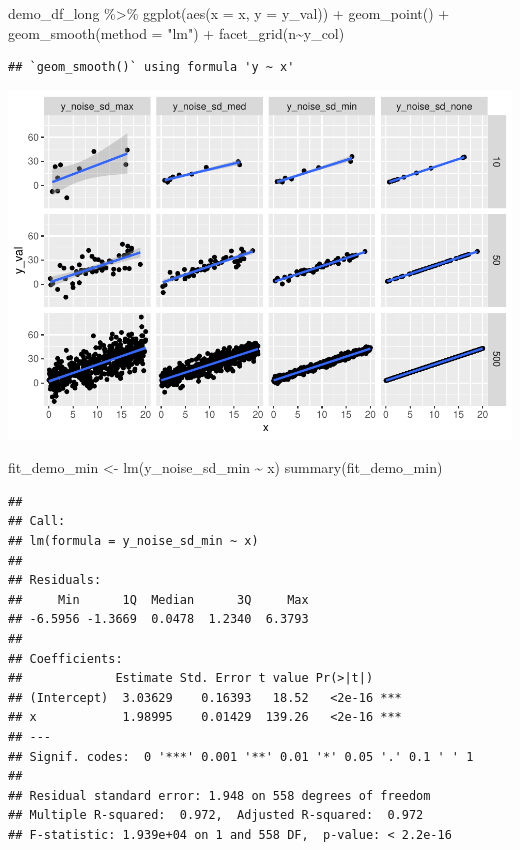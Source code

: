 \documentclass[
]{book}
\newenvironment{Shaded}{\begin{snugshade}}{\end{snugshade}}
\newcommand{\AttributeTok}[1]{\textcolor[rgb]{0.77,0.63,0.00}{#1}}
\newcommand{\FunctionTok}[1]{\textcolor[rgb]{0.00,0.00,0.00}{#1}}
\newcommand{\NormalTok}[1]{#1}
\newcommand{\OtherTok}[1]{\textcolor[rgb]{0.56,0.35,0.01}{#1}}
\newcommand{\SpecialCharTok}[1]{\textcolor[rgb]{0.00,0.00,0.00}{#1}}
\newcommand{\StringTok}[1]{\textcolor[rgb]{0.31,0.60,0.02}{#1}}
\begin{document}
\begin{Shaded}
\begin{Highlighting}[]
\NormalTok{demo\_df\_long }\SpecialCharTok{\%\textgreater{}\%} 
  \FunctionTok{ggplot}\NormalTok{(}\FunctionTok{aes}\NormalTok{(}\AttributeTok{x =}\NormalTok{ x, }\AttributeTok{y =}\NormalTok{ y\_val)) }\SpecialCharTok{+}
  \FunctionTok{geom\_point}\NormalTok{() }\SpecialCharTok{+}
  \FunctionTok{geom\_smooth}\NormalTok{(}\AttributeTok{method =} \StringTok{"lm"}\NormalTok{) }\SpecialCharTok{+} 
  \FunctionTok{facet\_grid}\NormalTok{(n}\SpecialCharTok{\textasciitilde{}}\NormalTok{y\_col)}
\end{Highlighting}
\end{Shaded}

\begin{verbatim}
## `geom_smooth()` using formula 'y ~ x'
\end{verbatim}

\includegraphics{test_course_notes_files/figure-latex/unnamed-chunk-85-1.pdf}

\begin{Shaded}
\begin{Highlighting}[]
\NormalTok{fit\_demo\_min }\OtherTok{\textless{}{-}} \FunctionTok{lm}\NormalTok{(y\_noise\_sd\_min }\SpecialCharTok{\textasciitilde{}}\NormalTok{ x)}
\FunctionTok{summary}\NormalTok{(fit\_demo\_min)}
\end{Highlighting}
\end{Shaded}

\begin{verbatim}
## 
## Call:
## lm(formula = y_noise_sd_min ~ x)
## 
## Residuals:
##     Min      1Q  Median      3Q     Max 
## -6.5956 -1.3669  0.0478  1.2340  6.3793 
## 
## Coefficients:
##             Estimate Std. Error t value Pr(>|t|)    
## (Intercept)  3.03629    0.16393   18.52   <2e-16 ***
## x            1.98995    0.01429  139.26   <2e-16 ***
## ---
## Signif. codes:  0 '***' 0.001 '**' 0.01 '*' 0.05 '.' 0.1 ' ' 1
## 
## Residual standard error: 1.948 on 558 degrees of freedom
## Multiple R-squared:  0.972,  Adjusted R-squared:  0.972 
## F-statistic: 1.939e+04 on 1 and 558 DF,  p-value: < 2.2e-16
\end{verbatim}
\end{document}
